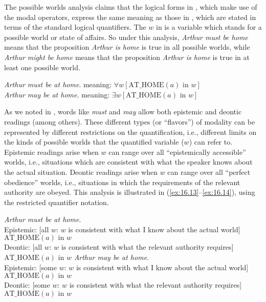 The possible worlds analysis claims that the logical forms in , which make use of the modal operators, express the same meaning as those in , which are stated in terms of the standard logical quantifiers. The $w$ in  is a variable which stands for a possible world or state of affairs. So under this analysis, \textit{Arthur must be home} means that the proposition \textit{Arthur is home} is true in all possible worlds, while \textit{Arthur might be home} means that the proposition \textit{Arthur is home} is true in at least one possible world.


\ea \label{ex:16.12}
\ea  \textit{Arthur must be at home}. \hfill meaning: $\forall w [\text{AT\_HOME}(a) \text{ in } w]$\\
\ex \textit{Arthur may be at home}.                 \hfill meaning: $\exists w [\text{AT\_HOME}(a) \text{ in } w]$
                       \z
\z


As we noted in , words like \textit{must} and \textit{may} allow both epistemic and deontic readings (among others). These different types (or “flavors”) of modality can be represented by different restrictions on the quantification, i.e., different limits on the kinds of possible worlds that the quantified variable ($w$) can refer to. Epistemic readings arise when $w$ can range over all “epistemically accessible” worlds, i.e., situations which are consistent with what the speaker knows about the actual situation. Deontic readings arise when $w$ can range over all “perfect obedience” worlds, i.e., situations in which the requirements of the relevant authority are obeyed. This analysis is illustrated in (\ref{ex:16.13}--\ref{ex:16.14}), using the restricted quantifier notation.


\ea \label{ex:16.13}
\textit{Arthur must be at home}.\\
  \ea Epistemic: {}[all $w$: $w$ is consistent with what I know about the actual world] $\text{AT\_HOME}(a) \text{ in } w$\\
  \ex Deontic: {}[all $w$: $w$ is consistent with what the relevant authority requires] $\text{AT\_HOME}(a) \text{ in } w$
  \z
\ex \label{ex:16.14}
\textit{Arthur may be at home}.\\
  \ea Epistemic: {}[some $w$: $w$ is consistent with what I know about the actual world] $\text{AT\_HOME}(a) \text{ in } w$\\
  \ex Deontic: {}[some $w$: $w$ is consistent with what the relevant authority requires] $\text{AT\_HOME}(a) \text{ in } w$
  \z
\z


